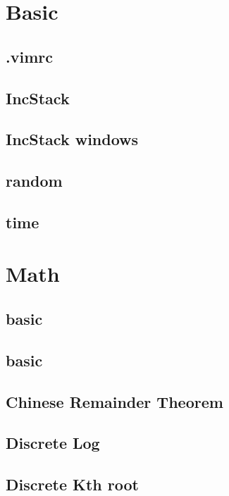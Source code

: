 \section{Basic}
\subsection{.vimrc}

\subsection{IncStack}

\subsection{IncStack windows}

\subsection{random}

\subsection{time}


\section{Math}
\subsection{basic}

\subsection{basic}

\subsection{Chinese Remainder Theorem}

\subsection{Discrete Log}

\subsection{Discrete Kth root}

